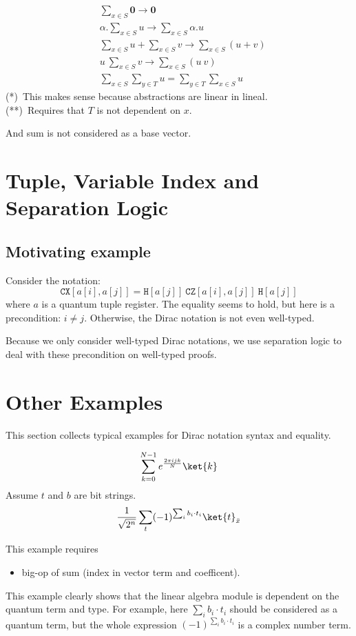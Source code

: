 \begin{definition}
    \begin{align*}
        & \sum_{x \in S} \mathbf{0} \to \mathbf{0} \\
        & \alpha.\sum_{x \in S} u \to \sum_{x \in S} \alpha.u \\
        & \sum_{x \in S} u + \sum_{x \in S} v  \to \sum_{x \in S} (u + v) \\
        \tag{*}
        & u\ \sum_{x \in S} v \to \sum_{x \in S} (u\ v)\\
        \tag{**}
        & \sum_{x \in S} \sum_{y \in T} u = \sum_{y \in T} \sum_{x \in S} u
    \end{align*}
(*)\ This makes sense because abstractions are linear in lineal.\\
(**)\ Requires that $T$ is not dependent on $x$.

And sum is not considered as a base vector.
\end{definition}



\section{Tuple, Variable Index and Separation Logic}

\subsection{Motivating example}

Consider the notation:
$$
\texttt{CX}[a[i], a[j]] = \texttt{H}[a[j]]\ \texttt{CZ}[a[i], a[j]]\ \texttt{H}[a[j]]
$$
where $a$ is a quantum tuple register. The equality seems to hold, but here is a precondition: $i \neq j$. Otherwise, the Dirac notation is not even well-typed. 

Because we only consider well-typed Dirac notations, we use separation logic to deal with these precondition on well-typed proofs.





\section{Other Examples}

This section collects typical examples for Dirac notation syntax and equality.

\begin{example}
  $$
  \sum_{k=0}^{N-1} e^{\frac{2\pi i j k}{N}}\ket{k}
  $$
  Assume $t$ and $b$ are bit strings.
  $$
  \frac{1}{\sqrt{2^n}} \sum_t (-1)^{\sum_i b_i \cdot t_i} \ket{t}_{\bar{x}}
  $$\end{example}
This example requires
\begin{itemize}
  \item big-op of sum (index in vector term and coefficent).
\end{itemize}
This example clearly shows that the linear algebra module is dependent on the quantum term and type. For example, here $\sum_i b_i \cdot t_i$ should be considered as a quantum term, but the whole expression $(-1)^{\sum_i b_i \cdot t_i}$ is a complex number term.



